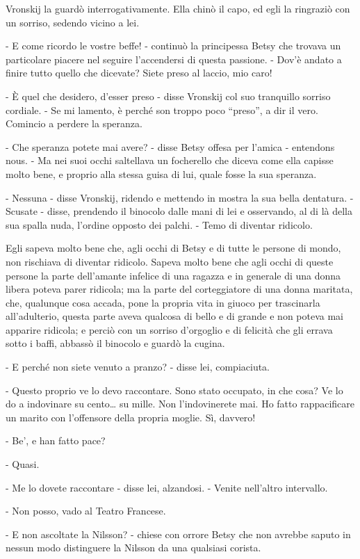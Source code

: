 Vronskij la guardò interrogativamente. Ella chinò il capo, ed egli la ringraziò con un sorriso, sedendo vicino a lei. 

- E come ricordo le vostre beffe! - continuò la principessa Betsy che trovava un particolare piacere nel seguire l'accendersi di questa passione. - Dov'è andato a finire tutto quello che dicevate? Siete preso al laccio, mio caro! 

- È quel che desidero, d'esser preso - disse Vronskij col suo tranquillo sorriso cordiale. - Se mi lamento, è perché son troppo poco ``preso'', a dir il vero. Comincio a perdere la speranza. 

- Che speranza potete mai avere? - disse Betsy offesa per l'amica - entendons nous. - Ma nei suoi occhi saltellava un focherello che diceva come ella capisse molto bene, e proprio alla stessa guisa di lui, quale fosse la sua speranza. 

- Nessuna - disse Vronskij, ridendo e mettendo in mostra la sua bella dentatura. - Scusate - disse, prendendo il binocolo dalle mani di lei e osservando, al di là della sua spalla nuda, l'ordine opposto dei palchi. - Temo di diventar ridicolo. 

Egli sapeva molto bene che, agli occhi di Betsy e di tutte le persone di mondo, non rischiava di diventar ridicolo. Sapeva molto bene che agli occhi di queste persone la parte dell'amante infelice di una ragazza e in generale di una donna libera poteva parer ridicola; ma la parte del corteggiatore di una donna maritata, che, qualunque cosa accada, pone la propria vita in giuoco per trascinarla all'adulterio, questa parte aveva qualcosa di bello e di grande e non poteva mai apparire ridicola; e perciò con un sorriso d'orgoglio e di felicità che gli errava sotto i baffi, abbassò il binocolo e guardò la cugina. 

- E perché non siete venuto a pranzo? - disse lei, compiaciuta. 

- Questo proprio ve lo devo raccontare. Sono stato occupato, in che cosa? Ve lo do a indovinare su cento\ldots{} su mille. Non l'indovinerete mai. Ho fatto rappacificare un marito con l'offensore della propria moglie. Sì, davvero! 

- Be', e han fatto pace? 

- Quasi. 

- Me lo dovete raccontare - disse lei, alzandosi. - Venite nell'altro intervallo. 

- Non posso, vado al Teatro Francese. 

- E non ascoltate la Nilsson? - chiese con orrore Betsy che non avrebbe saputo in nessun modo distinguere la Nilsson da una qualsiasi corista. 

